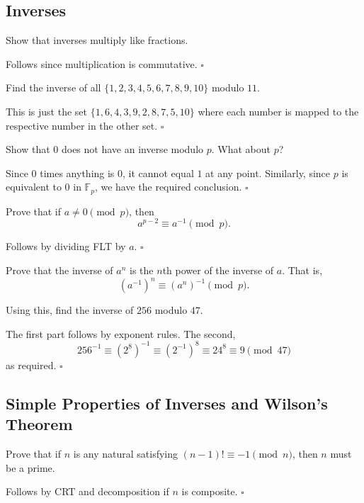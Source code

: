 \documentclass{article}
\begin{document}
\subsection{Inverses}

\begin{problem}[2.7.1]{}
Show that inverses multiply like fractions.
\end{problem}
Follows since multiplication is commutative. $\square$

\begin{problem}[2.7.2]{}
Find the inverse of all $\{1, 2, 3, 4, 5, 6, 7, 8, 9, 10\}$ modulo $11$.
\end{problem}
This is just the set $\{1, 6, 4, 3, 9, 2, 8, 7, 5, 10\}$ where each number is mapped to the respective number in the other set. $\square$

\begin{problem}[2.7.3]{}
Show that $0$ does not have an inverse modulo $p$. What about $p$?
\end{problem}
Since $0$ times anything is $0$, it cannot equal $1$ at any point. Similarly, since $p$ is equivalent to $0$ in $\mathbb{F}_p$, we have the required conclusion. $\square$

\begin{problem}[2.7.4]{}
Prove that if $a \neq 0 \pmod{p}$, then \[a^{p-2} \equiv a^{-1} \pmod{p}.\]
\end{problem}
Follows by dividing FLT by $a$. $\square$

\begin{problem}[2.7.5]{}
Prove that the inverse of $a^n$ is the $n$th power of the inverse of $a$. That is, \[(a^{-1})^n \equiv (a^n)^{-1} \pmod{p}.\]

Using this, find the inverse of $256$ modulo $47$.
\end{problem}
The first part follows by exponent rules. The second, \[256^{-1} \equiv (2^8)^{-1} \equiv (2^{-1})^8 \equiv 24^8 \equiv 9 \pmod{47}\] as required. $\square$

\subsection{Simple Properties of Inverses and Wilson's Theorem}

\begin{problem}[2.8.1]{}
Prove that if $n$ is any natural satisfying $(n - 1)! \equiv -1 \pmod{n}$, then $n$ must be a prime.
\end{problem}
Follows by CRT and decomposition if $n$ is composite. $\square$
\end{document}
